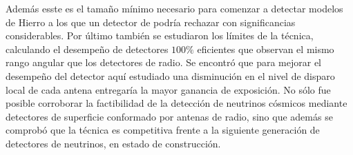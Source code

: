 Adem\'as esste es el tama\~no m\'inimo necesario para comenzar a detectar modelos de Hierro a los que un detector de  podr\'ia rechazar con significancias considerables.
Por \'ultimo tambi\'en se estudiaron los l\'imites de la t\'ecnica, calculando el desempe\~no de detectores $100\%$ eficientes que observan el mismo rango angular que los detectores de radio.
Se encontr\'o que para mejorar el desempe\~no del detector aqu\'i estudiado una disminuci\'on en el nivel de disparo local de cada antena entregar\'ia la mayor ganancia de exposici\'on.
No s\'olo fue posible corroborar la factibilidad de la detecci\'on de neutrinos c\'osmicos mediante detectores de superficie conformado por antenas de radio, sino que adem\'as se comprob\'o que la t\'ecnica es competitiva frente a la siguiente generaci\'on de detectores de neutrinos, en estado de construcci\'on.